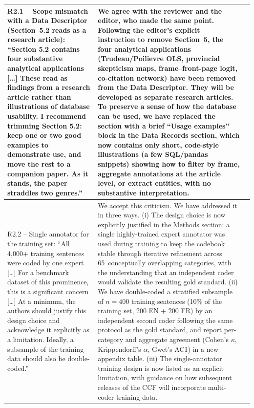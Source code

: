 \documentclass[11pt]{article}
\begin{document}
\begin{landscape}
\begin{longtable}{|L{4cm}|L{12cm}|L{9cm}|}
R2.1 -- Scope mismatch with a Data Descriptor (Section~5.2 reads as a research article): \enquote{Section 5.2 contains four substantive analytical applications [\dots] These read as findings from a research article rather than illustrations of database usability. I recommend trimming Section 5.2: keep one or two good examples to demonstrate use, and move the rest to a companion paper. As it stands, the paper straddles two genres.} &
We agree with the reviewer and the editor, who made the same point. Following the editor's explicit instruction to remove Section~5, the four analytical applications (Trudeau/Poilievre OLS, provincial skepticism maps, frame--front-page logit, co-citation network) have been removed from the Data Descriptor. They will be developed as separate research articles. To preserve a sense of how the database can be used, we have replaced the section with a brief \enquote{Usage examples} block in the Data Records section, which now contains only short, code-style illustrations (a few SQL/pandas snippets) showing how to filter by frame, aggregate annotations at the article level, or extract entities, with no substantive interpretation. &
\\
\hline

R2.2 -- Single annotator for the training set: \enquote{All 4{,}000+ training sentences were coded by one expert [\dots] For a benchmark dataset of this prominence, this is a significant concern [\dots] At a minimum, the authors should justify this design choice and acknowledge it explicitly as a limitation. Ideally, a subsample of the training data should also be double-coded.} &
We accept this criticism. We have addressed it in three ways. (i) The design choice is now explicitly justified in the Methods section: a single highly-trained expert annotator was used during training to keep the codebook stable through iterative refinement across 65~conceptually overlapping categories, with the understanding that an independent coder would validate the resulting gold standard. (ii) We have double-coded a stratified subsample of $n=400$ training sentences (10\% of the training set, 200 EN + 200 FR) by an independent second coder following the same protocol as the gold standard, and report per-category and aggregate agreement (Cohen's $\kappa$, Krippendorff's $\alpha$, Gwet's AC1) in a new appendix table. (iii) The single-annotator training design is now listed as an explicit limitation, with guidance on how subsequent releases of the CCF will incorporate multi-coder training data. &
\\
\hline


\end{longtable}
\end{landscape}
\end{document}
